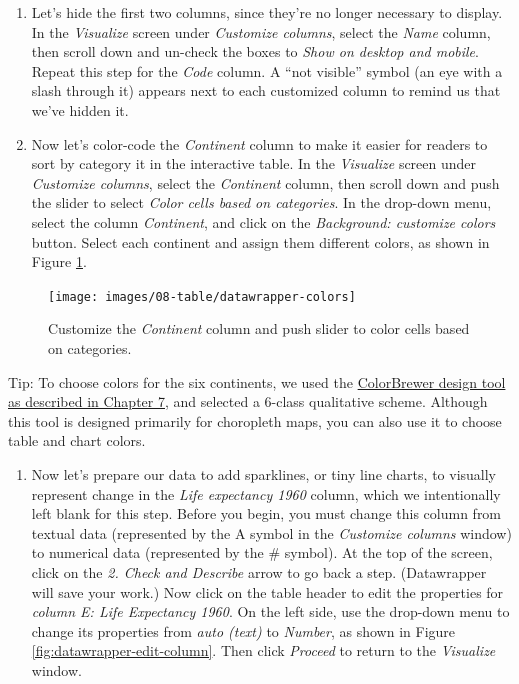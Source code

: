 \documentclass[
  english,
]{book}
\providecommand{\tightlist}{%
  \setlength{\itemsep}{0pt}\setlength{\parskip}{0pt}}
\begin{document}
\begin{enumerate}
\def\labelenumi{\arabic{enumi}.}
\setcounter{enumi}{7}
\item
  Let's hide the first two columns, since they're no longer necessary to display. In the \emph{Visualize} screen under \emph{Customize columns}, select the \emph{Name} column, then scroll down and un-check the boxes to \emph{Show on desktop and mobile}. Repeat this step for the \emph{Code} column. A ``not visible'' symbol (an eye with a slash through it) appears next to each customized column to remind us that we've hidden it.
\item
  Now let's color-code the \emph{Continent} column to make it easier for readers to sort by category it in the interactive table. In the \emph{Visualize} screen under \emph{Customize columns}, select the \emph{Continent} column, then scroll down and push the slider to select \emph{Color cells based on categories}. In the drop-down menu, select the column \emph{Continent}, and click on the \emph{Background: customize colors} button. Select each continent and assign them different colors, as shown in Figure \ref{fig:datawrapper-colors}.
\end{enumerate}



\begin{figure}
\texttt{[image: images/08-table/datawrapper-colors]} \caption{Customize the \emph{Continent} column and push slider to color cells based on categories.}\label{fig:datawrapper-colors}
\end{figure}

Tip: To choose colors for the six continents, we used the \href{design-choropleth.html}{ColorBrewer design tool as described in Chapter 7}, and selected a 6-class qualitative scheme. Although this tool is designed primarily for choropleth maps, you can also use it to choose table and chart colors.

\begin{enumerate}
\def\labelenumi{\arabic{enumi}.}
\setcounter{enumi}{9}
\tightlist
\item
  Now let's prepare our data to add sparklines, or tiny line charts, to visually represent change in the \emph{Life expectancy 1960} column, which we intentionally left blank for this step. Before you begin, you must change this column from textual data (represented by the A symbol in the \emph{Customize columns} window) to numerical data (represented by the \# symbol). At the top of the screen, click on the \emph{2. Check and Describe} arrow to go back a step. (Datawrapper will save your work.) Now click on the table header to edit the properties for \emph{column E: Life Expectancy 1960}. On the left side, use the drop-down menu to change its properties from \emph{auto (text)} to \emph{Number}, as shown in Figure \ref{fig:datawrapper-edit-column}. Then click \emph{Proceed} to return to the \emph{Visualize} window.
\end{enumerate}
\end{document}
